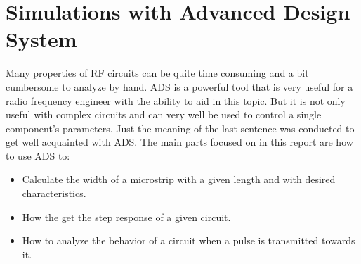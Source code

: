\documentclass[report.tex]{subfiles}
\begin{document}
\pagebreak \section{Simulations with Advanced Design System}
Many properties of RF circuits can be quite time consuming and a bit cumbersome to analyze by hand. ADS is a powerful tool that is very useful for a radio frequency engineer with the ability to aid in this topic. But it is not only useful with complex circuits and can very well be used to control a single component's parameters.
Just the meaning of the last sentence was conducted to get well acquainted with ADS. The main parts focused on in this report are how to use ADS to:
\begin{itemize}
	\item Calculate the width of a microstrip with a given length and with desired characteristics.
	\item How the get the step response of a given circuit.
	\item How to analyze the behavior of a circuit when a pulse is transmitted towards it.
\end{itemize}







\end{document}
